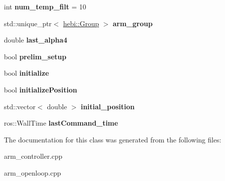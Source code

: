 \begin{DoxyCompactItemize}
\item 
int {\bfseries num\+\_\+temp\+\_\+filt} = 10\hypertarget{classarmcontroller_ac94be58df36d6609bbfe853e74993d7b}{}\label{classarmcontroller_ac94be58df36d6609bbfe853e74993d7b}

\item 
std\+::unique\+\_\+ptr$<$ \hyperlink{classhebi_1_1Group}{hebi\+::\+Group} $>$ {\bfseries arm\+\_\+group}\hypertarget{classarmcontroller_a4e1dce1703d8e68c372452231d60f2f0}{}\label{classarmcontroller_a4e1dce1703d8e68c372452231d60f2f0}

\item 
double {\bfseries last\+\_\+alpha4}\hypertarget{classarmcontroller_a98c171b07686d075da4c32b27e0920bd}{}\label{classarmcontroller_a98c171b07686d075da4c32b27e0920bd}

\item 
bool {\bfseries prelim\+\_\+setup}\hypertarget{classarmcontroller_ac58cebe1c8bc73c36bb2a9ffedeb6bec}{}\label{classarmcontroller_ac58cebe1c8bc73c36bb2a9ffedeb6bec}

\item 
bool {\bfseries initialize}\hypertarget{classarmcontroller_aab71e362590a95503d49b7250e03e582}{}\label{classarmcontroller_aab71e362590a95503d49b7250e03e582}

\item 
bool {\bfseries initialize\+Position}\hypertarget{classarmcontroller_a561ca355d83c1bba6ec7b3c6340109df}{}\label{classarmcontroller_a561ca355d83c1bba6ec7b3c6340109df}

\item 
std\+::vector$<$ double $>$ {\bfseries initial\+\_\+position}\hypertarget{classarmcontroller_a5dd1f731a514ad046ecd3324c9f83e02}{}\label{classarmcontroller_a5dd1f731a514ad046ecd3324c9f83e02}

\item 
ros\+::\+Wall\+Time {\bfseries last\+Command\+\_\+time}\hypertarget{classarmcontroller_acff5dcbe547461958f7a4b5e43b6c646}{}\label{classarmcontroller_acff5dcbe547461958f7a4b5e43b6c646}

\end{DoxyCompactItemize}


The documentation for this class was generated from the following files\+:\begin{DoxyCompactItemize}
\item 
arm\+\_\+controller.\+cpp\item 
arm\+\_\+openloop.\+cpp\end{DoxyCompactItemize}
